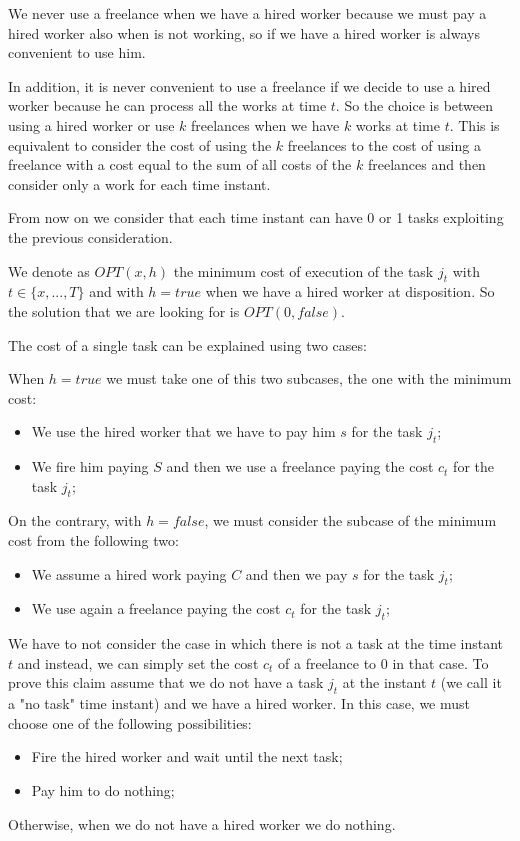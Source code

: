 \documentclass[paper=a4, fontsize=11pt]{scrartcl} %
\numberwithin{equation}{section} %
\numberwithin{figure}{section} %
\numberwithin{table}{section} %
\begin{document}
We never use a freelance when we have a hired worker because we must pay a hired worker also when is not working, so if we have a hired worker is always convenient to use him.

In addition, it is never convenient to use a freelance if we decide to use a hired worker because he can process all the works at time $t$.
So the choice is between using a hired worker or use $k$ freelances when we have $k$ works at time $t$. This is equivalent to consider the cost of using the $k$ freelances to the cost of using a freelance with a cost equal to the sum of all costs of the $k$ freelances and then consider only a work for each time instant.

From now on we consider that each time instant can have 0 or 1 tasks exploiting the previous consideration.

We denote as $OPT(x, h)$ the minimum cost of execution of the task $j_t$ with $t \in \{x,...,T\}$ and with $h = true$ when we have a hired worker at disposition.
So the solution that we are looking for is $OPT(0, false)$.

The cost of a single task can be explained using two cases:

When $h = true$ we must take one of this two subcases, the one with the minimum cost:
\begin{itemize}
    \item We use the hired worker that we have to pay him $s$ for the task $j_t$;
    \item We fire him paying $S$ and then we use a freelance paying the cost $c_t$ for the task $j_t$;
\end{itemize}
On the contrary, with $h = false$, we must consider the subcase of the minimum cost from the following two:
\begin{itemize}
    \item We assume a hired work paying $C$ and then we pay $s$ for the task $j_t$;
    \item We use again a freelance paying the cost $c_t$ for the task $j_t$;
\end{itemize}

We have to not consider the case in which there is not a task at the time instant $t$ and instead, we can simply set the cost $c_t$ of a freelance to $0$ in that case.
To prove this claim assume that we do not have a task $j_t$ at the instant $t$ (we call it a "no task" time instant) and we have a hired worker.
In this case, we must choose one of the following possibilities:
\begin{itemize}
    \item Fire the hired worker and wait until the next task;
    \item Pay him to do nothing;
\end{itemize}
Otherwise, when we do not have a hired worker we do nothing.
\end{document}
